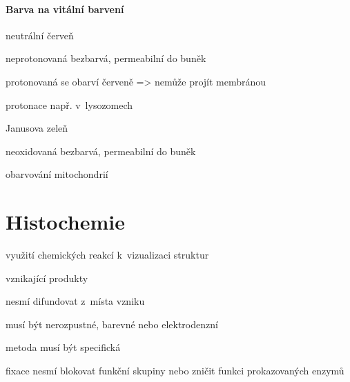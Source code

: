 \documentclass[DIV=8]{scrreprt}
\begin{document}
\paragraph{Barva na vitální barvení}
\begin{myItemize}[nosep]
    \item neutrální červeň
\begin{myItemize}[nosep]
    \item neprotonovaná bezbarvá, permeabilní do buněk
    \item protonovaná se obarví červeně => nemůže projít membránou
    \item protonace např. v lysozomech
\end{myItemize}

    \item Janusova zeleň
\begin{myItemize}[nosep]
    \item neoxidovaná bezbarvá, permeabilní do buněk
    \item obarvování mitochondrií
\end{myItemize}

\end{myItemize}



\section{Histochemie} \label{Histochemie} \FloatBarrier


\begin{myItemize}[nosep]
    \item využití chemických reakcí k vizualizaci struktur
    \item vznikající produkty
\begin{myItemize}[nosep]
    \item nesmí difundovat z místa vzniku
    \item musí být nerozpustné, barevné nebo elektrodenzní
\end{myItemize}

    \item metoda musí být specifická
    \item fixace nesmí blokovat funkční skupiny nebo zničit funkci prokazovaných enzymů
\end{myItemize}
\end{document}
